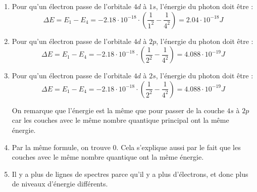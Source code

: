 \documentclass{article}
\begin{document}
\begin{enumerate}
	\item Pour qu'un électron passe de l'orbitale $4d$ à $1s$, l'énergie du photon doit être :
				$$\Delta E = E_1 - E_4 = -2.18 \cdot 10^{-18} \cdot (\frac{1}{1^2} - \frac{1}{4^2}) = 2.04 
				\cdot 10^{-18} J$$
	\item	Pour qu'un électron passe de l'orbitale $4d$ à $2p$, l'énergie du photon doit être :
				$$\Delta E = E_1 - E_4 = -2.18 \cdot 10^{-18} \cdot (\frac{1}{2^2} - \frac{1}{4^2}) = 4.088 
				\cdot 10^{-19} J$$
	\item Pour qu'un électron passe de l'orbitale $4d$ à $2s$, l'énergie du photon doit être :
				$$\Delta E = E_1 - E_4 = -2.18 \cdot 10^{-18} \cdot (\frac{1}{2^2} - \frac{1}{4^2}) = 4.088 
				\cdot 10^{-19} J$$
				
				On remarque que l'énergie est la même que pour passer de la couche $4s$ à $2p$ car les couches
				avec le même nombre quantique principal ont la même énergie.
	\item	Par la même formule, on trouve 0. Cela s'explique aussi par le fait que les couches avec le même 
				nombre quantique ont la même énergie.
	\item Il y a plus de lignes de spectres parce qu'il y a plus d'électrons, et donc plus de niveaux d'énergie différents.
\end{enumerate}
\end{document}
